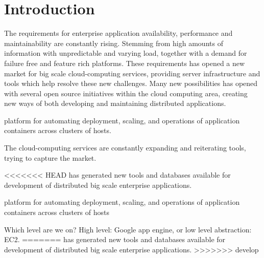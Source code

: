 \chapter{Introduction}
\label{ch:introduction}
The requirements for enterprise application availability, performance and maintainability are constantly rising. Stemming from high amounts of information with unpredictable and varying load, together with a demand for failure free and feature rich platforms. These requirements has opened a new market for big scale cloud-computing services, providing server infrastructure and tools which help resolve these new challenges. Many new possibilities has opened with several open source initiatives within the cloud computing area, creating new ways of both developing and maintaining distributed applications.






platform for automating deployment, scaling, and operations of application containers across clusters of hosts.

The cloud-computing services are constantly expanding and reiterating tools, trying to capture the market.

<<<<<<< HEAD
has generated new tools and databases available for development of distributed big scale enterprise applications.






platform for automating deployment, scaling, and operations of application containers across clusters of hosts


Which level are we on? High level: Google app engine, or low level abstraction: EC2.
=======
has generated new tools and databases available for development of distributed big scale enterprise applications.
>>>>>>> develop
